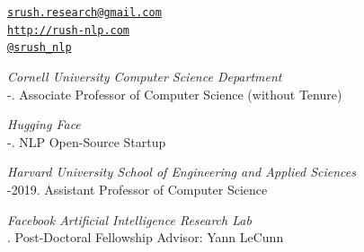 \documentclass[10pt]{article}
\makeatletter
\def\myemail{srush.research@gmail.com}
\def\myweb{http://rush-nlp.com}
\def\myphone{(215) 317-8089}
\def\myfax{srush\_nlp}
\makeatother
\begin{document}
\begin{minipage}[t]{2.95in}

\end{minipage}
\hfill
\hfill
\begin{minipage}[t]{1.7in}
  \flushright %
  {\scriptsize  \texttt{\href{mailto:\myemail}{\myemail}}} \\
  {\scriptsize  \texttt{\href{\myweb}{\myweb}}} \\
  {\scriptsize  \texttt{\href{http://twitter.com/\myfax}{@\myfax}}} \\
\end{minipage}


\medskip

\reversemarginpar
\medskip


\noindent\emph{Cornell University Computer Science Department \vspace{0.01in}}\\
-.  Associate Professor of Computer Science (without Tenure)

\medskip
\noindent\emph{Hugging Face \vspace{0.01in}}\\
-.  NLP Open-Source Startup

\medskip
\noindent\emph{Harvard University School of Engineering and Applied Sciences \vspace{0.01in}}\\
-2019.  Assistant Professor of Computer Science

\medskip
\noindent\emph{Facebook Artificial Intelligence Research Lab \vspace{0.01in}}\\
.  Post-Doctoral Fellowship Advisor: Yann LeCunn

\bigskip

\end{document}
